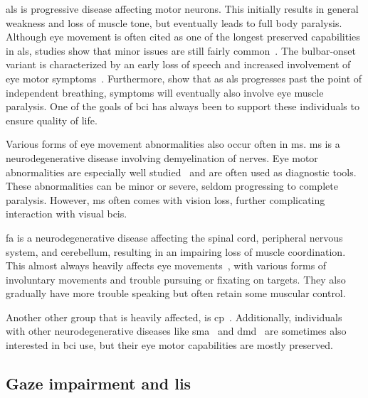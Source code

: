 \ac{als} is progressive disease affecting motor neurons.
This initially results in general weakness and loss of muscle tone, but
eventually leads to full body paralysis.
Although eye movement is often cited as one of the longest preserved
capabilities in \ac{als}, studies show that minor issues are still
fairly common~\cite{Kang2018, Guo2022,Moss2012}.
The bulbar-onset variant is characterized by an early loss of speech
and increased involvement of eye motor symptoms~\cite{Guo2022}.
Furthermore, \textcite{Hayashi1991} show that as \ac{als} progresses past
the point of independent breathing, symptoms will eventually also involve
eye muscle paralysis.
One of the goals of \ac{bci} has always been to support these individuals to
ensure quality of life.

Various forms of eye movement abnormalities also occur often in
\ac{ms}.
\Ac{ms} is a neurodegenerative disease involving demyelination of nerves.
Eye motor abnormalities are especially well
studied~\cite{Mueri1985,Prasad2010,Castelnovo2016,Serra2018,Polet2020} and
are often used as diagnostic tools.
These abnormalities can be minor or severe, seldom progressing to complete
paralysis.
However, \ac{ms} often comes with vision loss, further complicating interaction
with visual \acp{bci}.

\Ac{fa} is a neurodegenerative disease affecting the
spinal cord, peripheral nervous system, and cerebellum, resulting in an
impairing loss of muscle coordination.
This almost always heavily affects eye
movements~\cite{Fahey2008,Hocking2010,Furman1983,Cook2017}, with various forms of
involuntary movements and trouble pursuing or fixating on targets.
They also gradually have more trouble speaking but often retain some muscular
control.

Another other group that is heavily affected, is \ac{cp}~\cite{Fazzi2012}.
Additionally, individuals with other neurodegenerative diseases like
\ac{sma}~\cite{Anagnostou2021} and \ac{dmd}~\cite{Lui2001} are
sometimes also interested in \ac{bci} use, but their eye motor capabilities are
mostly preserved.

\subsection{Gaze impairment and \acl{lis}}
\label{sec:gaze-independence/oculomotor/gaze}
\newcommand\fnlis{\footnote{Multiple definitions of \ac{lis} are encountered in
\ac{bci} and neurological literature.
Some definitions include only those with tetraplegy without eye movements used
for communications.
Others distinguish Complete Locked-in Syndrome (CLIS) with full body paralysis,
including no eye motor control at all, from a \ac{lis} state with some preserved eye
movements or minor motor output.
While some definitions only include stroke or \ac{tbi} with damage to
specific regions in the brain (midbrain, brainstem, or
cerebellum)~\cite{Smith2005}, it can also generally refer to the state of full body paralysis
or loss of muscle tone incurred in neurodegenerative diseases, combined with
the inability to speak, such as occurs in late-stage ALS.}}

